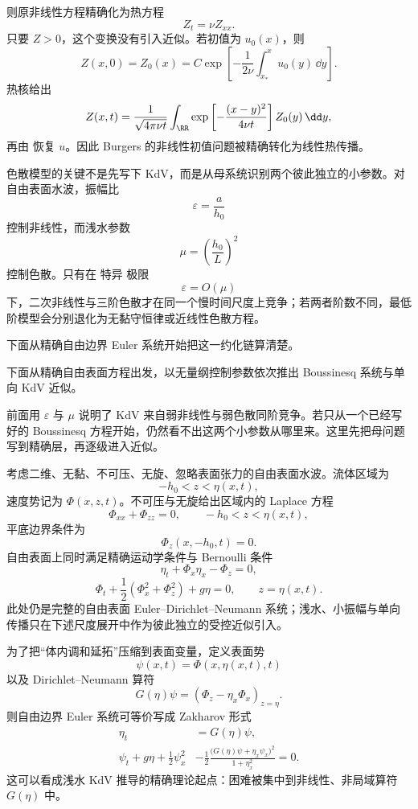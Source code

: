 则原非线性方程精确化为热方程
\begin{equation*}Z_t=\nu Z_{xx}.\end{equation*}
只要 $Z>0$，这个变换没有引入近似。若初值为 $u_0(x)$，则
\[
Z(x,0)
=Z_0(x)
=C\exp\left[
-\frac1{2\nu}
\int_{x_*}^xu_0(y)\,\dd y
\right].
\]
热核给出
\[
Z(x,t)=
\frac1{\sqrt{4\pi\nu t}}
\int_{\RR}
\exp\left[-\frac{(x-y)^2}{4\nu t}\right]
Z_0(y)\,\dd y,
\]
再由 恢复 $u$。因此 Burgers 的非线性初值问题被精确转化为线性热传播。

色散模型的关键不是先写下 KdV，而是从母系统识别两个彼此独立的小参数。对自由表面水波，振幅比
\[
\varepsilon=\frac{a}{h_0}
\]
控制非线性，而浅水参数
\[
\mu=\left(\frac{h_0}{L}\right)^2
\]
控制色散。只有在 特异 极限
\[
\varepsilon=O(\mu)
\]
下，二次非线性与三阶色散才在同一个慢时间尺度上竞争；若两者阶数不同，最低阶模型会分别退化为无黏守恒律或近线性色散方程。

下面从精确自由边界 Euler 系统开始把这一约化链算清楚。

下面从精确自由表面方程出发，以无量纲控制参数依次推出 Boussinesq 系统与单向 KdV 近似。

前面用 $\varepsilon$ 与 $\mu$ 说明了 KdV 来自弱非线性与弱色散同阶竞争。若只从一个已经写好的 Boussinesq 方程开始，仍然看不出这两个小参数从哪里来。这里先把母问题写到精确层，再逐级进入近似。

考虑二维、无黏、不可压、无旋、忽略表面张力的自由表面水波。流体区域为
\[
-h_0<z<\eta(x,t),
\]
速度势记为 $\Phi(x,z,t)$。不可压与无旋给出区域内的 Laplace 方程
\[
\Phi_{xx}+\Phi_{zz}=0,
\qquad -h_0<z<\eta(x,t),
\]
平底边界条件为
\[
\Phi_z(x,-h_0,t)=0.
\]
自由表面上同时满足精确运动学条件与 Bernoulli 条件
\[
\eta_t+\Phi_x\eta_x-\Phi_z=0,
\]
\[
\Phi_t+\frac12(\Phi_x^2+\Phi_z^2)+g\eta=0,
\qquad z=\eta(x,t).
\]
此处仍是完整的自由表面 Euler--Dirichlet--Neumann 系统；浅水、小振幅与单向传播只在下述尺度展开中作为彼此独立的受控近似引入。

为了把“体内调和延拓”压缩到表面变量，定义表面势
\[
\psi(x,t)=\Phi(x,\eta(x,t),t)
\]
以及 Dirichlet--Neumann 算符
\[
G(\eta)\psi=(\Phi_z-\eta_x\Phi_x)_{z=\eta}.
\]
则自由边界 Euler 系统可等价写成 Zakharov 形式
\begin{equation}
\boxed{
\begin{aligned}
\eta_t&=G(\eta)\psi,\\
\psi_t+g\eta+\frac12\psi_x^2
&-\frac12\frac{\bigl(G(\eta)\psi+\eta_x\psi_x\bigr)^2}{1+\eta_x^2}=0.
\end{aligned}
}
\label{eq:zakharov-water-wave}
\end{equation}
这可以看成浅水 KdV 推导的精确理论起点：困难被集中到非线性、非局域算符 $G(\eta)$ 中。

